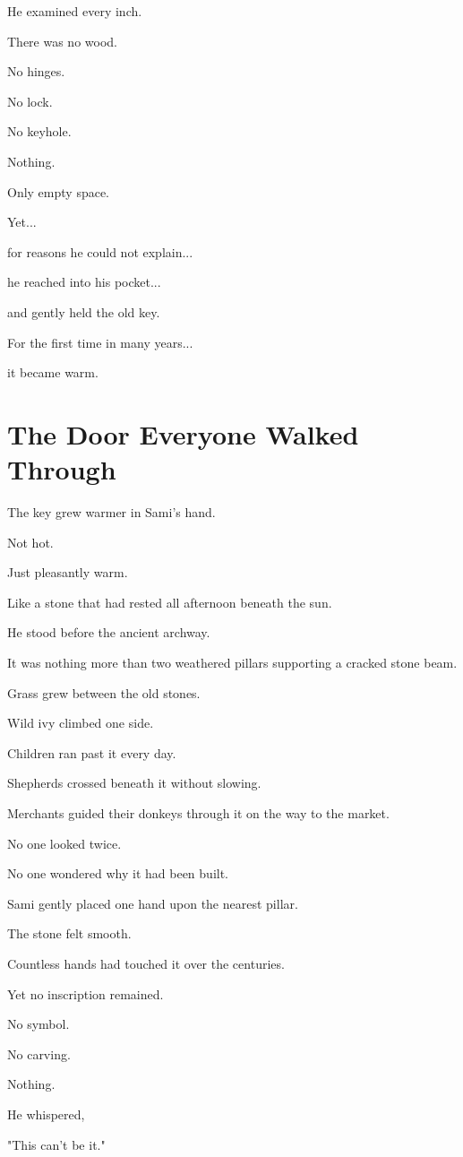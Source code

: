 \documentclass[12pt,openany]{book}
\begin{document}
He examined every inch.

There was no wood.

No hinges.

No lock.

No keyhole.

Nothing.

Only empty space.

Yet...

for reasons he could not explain...

he reached into his pocket...

and gently held the old key.

For the first time in many years...

it became warm.
\section*{The Door Everyone Walked Through}

The key grew warmer in Sami's hand.

Not hot.

Just pleasantly warm.

Like a stone that had rested all afternoon beneath the sun.

He stood before the ancient archway.

It was nothing more than two weathered pillars supporting a cracked stone beam.

Grass grew between the old stones.

Wild ivy climbed one side.

Children ran past it every day.

Shepherds crossed beneath it without slowing.

Merchants guided their donkeys through it on the way to the market.

No one looked twice.

No one wondered why it had been built.

Sami gently placed one hand upon the nearest pillar.

The stone felt smooth.

Countless hands had touched it over the centuries.

Yet no inscription remained.

No symbol.

No carving.

Nothing.

He whispered,

"This can't be it."
\end{document}
